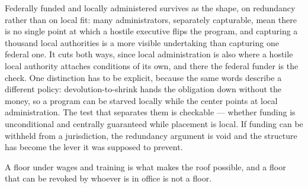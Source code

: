Federally funded and locally administered survives as the shape, on redundancy rather than on local fit: many administrators, separately capturable, mean there is no single point at which a hostile executive flips the program, and capturing a thousand local authorities is a more visible undertaking than capturing one federal one. It cuts both ways, since local administration is also where a hostile local authority attaches conditions of its own, and there the federal funder is the check. One distinction has to be explicit, because the same words describe a different policy: devolution-to-shrink hands the obligation down without the money, so a program can be starved locally while the center points at local administration. The test that separates them is checkable — whether funding is unconditional and centrally guaranteed while placement is local. If funding can be withheld from a jurisdiction, the redundancy argument is void and the structure has become the lever it was supposed to prevent.

A floor under wages and training is what makes the roof possible, and a floor that can be revoked by whoever is in office is not a floor.
